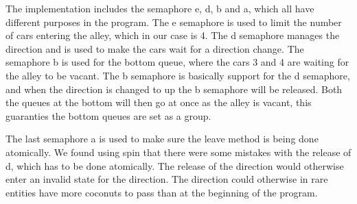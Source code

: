 The implementation includes the semaphore e, d, b and a, which all have different purposes in the program. The e semaphore is used to limit the number of cars entering the alley, which in our case is 4. The d semaphore manages the direction and is used to make the cars wait for a direction change. The semaphore b is used for the bottom queue, where the cars 3 and 4 are waiting for the alley to be vacant. The b semaphore is basically support for the d semaphore, and when the direction is changed to up the b semaphore will be released. Both the queues at the bottom will then go at once as the alley is vacant, this guaranties the bottom queues are set as a group.

The last semaphore a is used to make sure the leave method is being done atomically. We found using spin that there were some mistakes with the release of d, which has to be done atomically. The release of the direction would otherwise enter an invalid state for the direction. The direction could otherwise in rare entities have more coconuts to pass than at the beginning of the program.